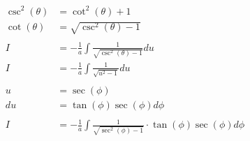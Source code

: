 \documentclass[12pt]{article}
\begin{document}
\begin{align}
    \csc^2(\theta)                                         & = \cot^2(\theta) + 1                                                                                                                                          \\
    \cot(\theta)                                           & = \sqrt{\csc^2(\theta)-1}                                                                                                                                     \\
    \nonumber                                                                                                                                                                                                              \\
    I                                                      & = -\frac{1}{a} \int \frac{1}{\sqrt{\csc^2(\theta)-1}} du                                                                                                      \\
    I                                                      & = -\frac{1}{a} \int \frac{1}{\sqrt{u^2-1}} du                                                                                                                 \\
    \nonumber                                                                                                                                                                                                              \\
    u                                                      & = \sec(\phi)                                                                                                                                                  \\
    du                                                     & = \tan(\phi)\sec(\phi) d\phi                                                                                                                                  \\
    \nonumber                                                                                                                                                                                                              \\
    I                                                      & = -\frac{1}{a} \int \frac{1}{\sqrt{\sec^2(\phi)-1}} \cdot \tan(\phi)\sec(\phi) d\phi                                                                          \\

\end{align}
\end{document}
